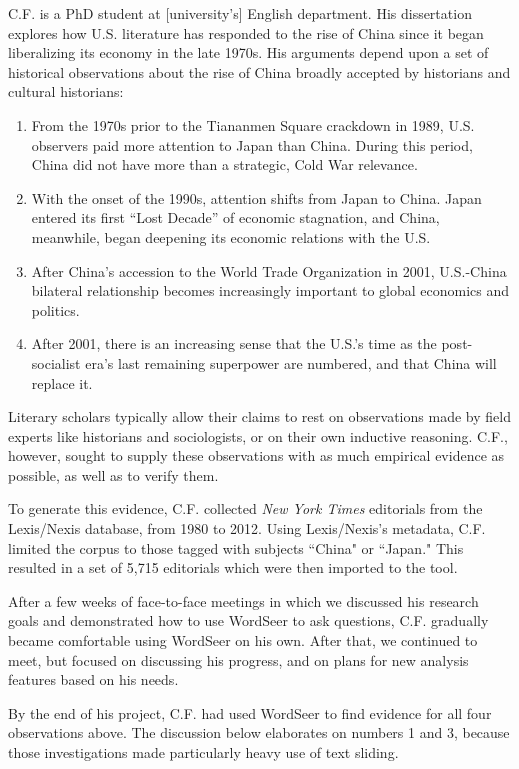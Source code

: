 \documentclass{sig-alternate}
\begin{document}
C.F. is a PhD student at [university's] English department. His dissertation explores how U.S. literature has responded to the rise of China since it began liberalizing its economy in the late 1970s.  His arguments depend upon a set of historical observations about the rise of China  broadly accepted by historians and cultural historians: 
\begin{enumerate}
\item From the 1970s prior to the Tiananmen Square crackdown in 1989, U.S. observers paid more attention to Japan than China. During this period, China did not have  more than a strategic, Cold War relevance. 
\item With the onset of the 1990s, attention shifts from Japan to China. Japan entered its first ``Lost Decade'' of economic stagnation, and China, meanwhile, began deepening its economic relations with the U.S.
\item After China's accession to the World Trade Organization in 2001, U.S.-China bilateral relationship becomes increasingly important to global economics and politics.
\item After 2001, there is an increasing sense that the U.S.'s time as the post-socialist era's last remaining superpower are numbered, and that China will replace it.
\end{enumerate}
Literary scholars typically allow their claims to rest on observations made by field experts like historians and sociologists, or on their own inductive reasoning. C.F., however, sought to supply these observations with as much empirical evidence as possible, as well as to verify them.

To generate this evidence, C.F. collected \emph{New York Times} editorials from  the Lexis/Nexis database, from 1980 to 2012. Using Lexis/Nexis's metadata, C.F. limited the corpus to those tagged with subjects ``China" or ``Japan." This resulted in a set of 5,715 editorials which were then imported to the tool.

After a few weeks of face-to-face meetings in which we discussed his research goals and demonstrated how to use WordSeer to ask questions, C.F. gradually became comfortable using WordSeer on his own. After that, we continued to meet, but focused on discussing his progress, and on plans for new analysis features based on his needs.

By the end of his project, C.F. had used WordSeer to find evidence for all four observations above. The discussion below elaborates on numbers 1 and 3, because those investigations made particularly heavy use of text sliding.
\end{document}
